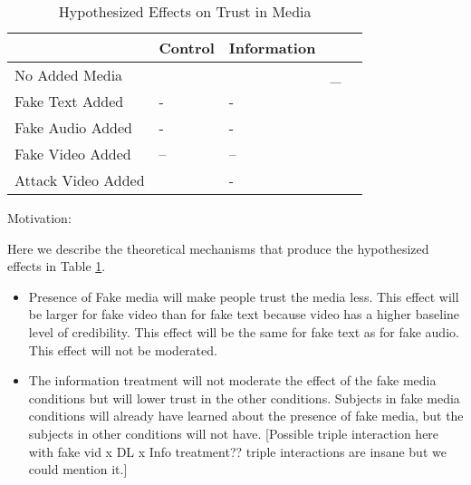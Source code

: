 \begin{table}[]
\caption{Hypothesized Effects on Trust in Media \label{H3}}
\begin{tabular}{l|llll}
 & Control  & Information &  \\
\hline
No Added Media &  &  & _ \\
Fake Text Added & -  & -  &  \\
Fake Audio Added & - & - &  \\
Fake Video Added & -- & -- &  \\
Attack Video Added &  & - &   
\end{tabular}
\end{table}

Motivation:

Here we describe the theoretical mechanisms that produce the hypothesized effects in Table \ref{H3}.

\begin{itemize}
    \item Presence of Fake media will make people trust the media less. This effect will be larger for fake video than for fake text because video has a higher baseline level of credibility. This effect will be the same for fake text as for fake audio. This effect will not be moderated.

    \item The information treatment will not moderate the effect of the fake media conditions but will lower trust in the other conditions. Subjects in fake media conditions will already have learned about the presence of fake media, but the subjects in other conditions will not have. [Possible triple interaction here with fake vid x DL x Info treatment?? triple interactions are insane but we could mention it.]
    
\end{itemize}
